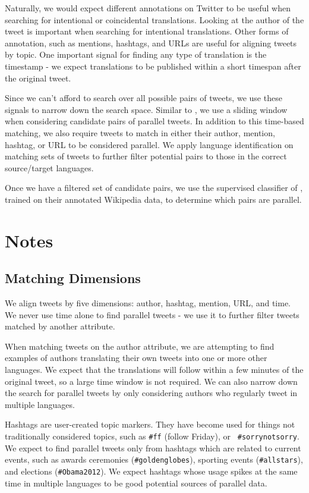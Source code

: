 Naturally, we would expect different annotations on Twitter to be useful when
searching for intentional or coincidental translations. Looking at the author of
the tweet is important when searching for intentional translations. Other forms
of annotation, such as mentions, hashtags, and URLs are useful for aligning tweets by
topic. One important signal for finding any type of translation is the timestamp - we
expect translations to be published within a short timespan after the original
tweet.

Since we can't afford to search over all possible pairs of tweets, we use these
signals to narrow down the search space.
Similar to \citet{Munteanu05}, we use a sliding window when considering
candidate pairs of parallel tweets. In addition to this time-based matching, we
also require tweets to match in either their author, mention, hashtag, or URL to be
considered parallel.
We apply language identification \citep{Bergsma12} on matching sets of tweets to
further filter potential pairs to those in the correct source/target languages.

Once we have a filtered set of candidate pairs, we use the supervised classifier
of \citet{Smith10}, trained on their annotated Wikipedia data, to determine which
pairs are parallel.

\section{Notes}

\subsection{Matching Dimensions}
We align tweets by five dimensions: author, hashtag, mention, URL, and time.
We never use time alone to find parallel tweets - we use it to
further filter tweets matched by another attribute.

When matching tweets on the author attribute, we are attempting to find examples
of authors translating their own tweets into one or more other languages. We
expect that the translations will follow within a few minutes of the original tweet,
so a large time window is not required. We can also narrow down the search for
parallel tweets by only considering authors who regularly tweet in multiple
languages.

Hashtags are user-created topic markers. They have become used for things not
traditionally considered topics, such as {\tt \#ff} (follow Friday), or {\tt
\#sorrynotsorry}. We expect to find parallel tweets only from hashtags which
are related to current events, such as awards ceremonies ({\tt \#goldenglobes}),
sporting events ({\tt \#allstars}), and elections ({\tt \#Obama2012}).
We expect hashtags whose usage spikes at the same time in multiple languages to
be good potential sources of parallel data.

